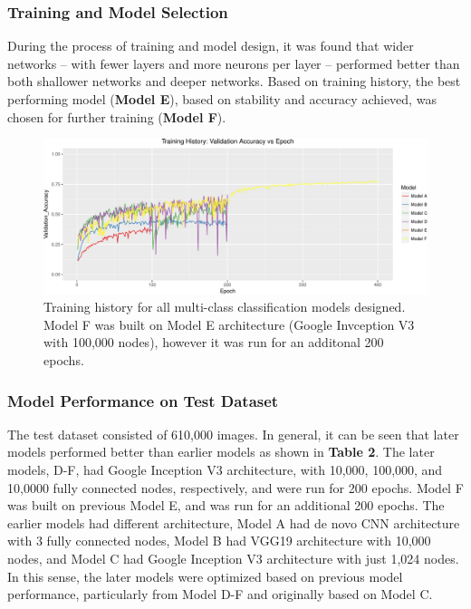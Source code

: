 \documentclass[12pt,]{article}
\begin{document}
\subsubsection{Training and Model
Selection}\label{training-and-model-selection}

During the process of training and model design, it was found that wider
networks -- with fewer layers and more neurons per layer -- performed
better than both shallower networks and deeper networks. Based on
training history, the best performing model (\textbf{Model E}), based on
stability and accuracy achieved, was chosen for further training
(\textbf{Model F}).

\begin{figure}[H]

{\centering \includegraphics{figure/graphics-unnamed-chunk-7-1} 

}

\caption{Training history for all multi-class classification models designed. Model F was built on Model E architecture (Google Invception V3 with 100,000 nodes), however it was run for an additonal 200 epochs.}\label{fig:unnamed-chunk-7}
\end{figure}

\subsubsection{Model Performance on Test
Dataset}\label{model-performance-on-test-dataset}

The test dataset consisted of 610,000 images. In general, it can be seen
that later models performed better than earlier models as shown in
\textbf{Table 2}. The later models, D-F, had Google Inception V3
architecture, with 10,000, 100,000, and 10,0000 fully connected nodes,
respectively, and were run for 200 epochs. Model F was built on previous
Model E, and was run for an additional 200 epochs. The earlier models
had different architecture, Model A had de novo CNN architecture with 3
fully connected nodes, Model B had VGG19 architecture with 10,000 nodes,
and Model C had Google Inception V3 architecture with just 1,024 nodes.
In this sense, the later models were optimized based on previous model
performance, particularly from Model D-F and originally based on Model
C.
\end{document}
